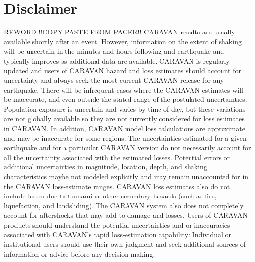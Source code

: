 \documentclass{article}
\begin{document}
\section*{Disclaimer}
REWORD !!COPY PASTE FROM PAGER!! CARAVAN results are usually available shortly after an event. 
However, information on the extent of shaking will be uncertain in the minutes and hours following and earthquake and typically improves as additional data are available.
CARAVAN is regularly updated and users of CARAVAN hazard and loss estimates should account for uncertainty and always seek the most current CARAVAN release for any earthquake.
There will be infrequent cases where the CARAVAN estimates will be inaccurate, and even outside the stated range of the postulated uncertainties.
Population exposure is uncertain and varies by time of day, but these variations are not globally available so they are not currently considered for loss estimates in CARAVAN.
In addition, CARAVAN model loss calculations are approximate and may be inaccurate for some regions.
The uncertainties estimated for a given earthquake and for a particular CARAVAN version do not necessarily account for all the uncertainty associated with the estimated losses.
Potential errors or additional uncertainties in magnitude, location, depth, and shaking characteristics maybe not modeled explicitly and may remain unaccounted for in the CARAVAN loss{-}estimate ranges.
CARAVAN loss estimates also do not include losses due to tsunami or other secondary hazards (such as fire, liquefaction, and landsliding).
The CARAVAN system also does not completely account for aftershocks that may add to damage and losses.
Users of CARAVAN products should understand the potential uncertainties and or inaccuracies associated with CARAVAN's rapid loss{-}estimation capability: Individual or institutional users should use their own judgment and seek additional sources of information or advice before any decision making.
\end{document}
